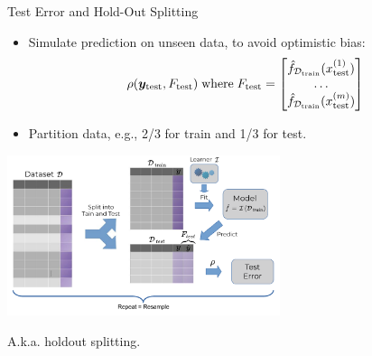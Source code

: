 \begin{vbframe}{Test Error and Hold-Out Splitting}

  \small
\begin{itemize}
  \item Simulate prediction on unseen data, to avoid optimistic bias:
\small
$$\rho(\yv_{\mathrm{test}}, F_{\textrm{test}})\;\text{where}\; 
F_{\textrm{test}} = \begin{bmatrix} 
\fhDtrain(\xi[1]_{\textrm{test}}) \\ 
\dots \\
\fhDtrain(\xi[m]_{\textrm{test}})
\end{bmatrix}$$ 
  \item Partition data, e.g., 2/3 for train and 1/3 for test.
\end{itemize}

\begin{center}

  \includegraphics[width=0.6\textwidth]{figure_man/test_error.pdf}

\end{center}
A.k.a. holdout splitting.

\end{vbframe}

